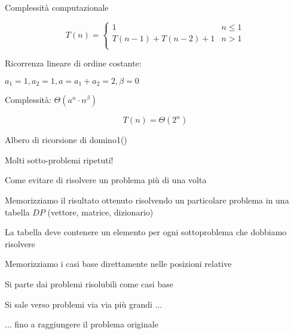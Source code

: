 \begin{frame}{Complessità computazionale}

\vspace{-9pt}

\[
  T(n) = \begin{cases}
  1 & n \leq 1 \\
  T(n-1)+T(n-2)+1 & n > 1\\
  \end{cases}
\]

\pause
Ricorrenza lineare di ordine costante:
\BI
\item $a_1 = 1, a_2=1, a= a_1+a_2 = 2, \beta=0$
\item Complessità: $\Theta(a^n \cdot n^\beta)$
\EI

\[
T(n) = \Theta(2^n)
\]

\end{frame}

\begin{frame}{Albero di ricorsione di \textsf{domino1()}}
  

\vspace{-12pt}
\begin{flushright}
Molti sotto-problemi ripetuti!
\end{flushright}
\end{frame}

\begin{frame}{Come evitare di risolvere un problema più di una volta}
  
\vspace{-9pt}
\begin{myboxtitle}[Tabella DP]
\BIL
\item Memorizziamo il risultato ottenuto risolvendo un particolare problema
in una \alert{tabella $\mathit{DP}$} (vettore, matrice, dizionario)
\item La tabella deve contenere un elemento per ogni sottoproblema che dobbiamo risolvere
\EIL
\end{myboxtitle}

\begin{myboxtitle}
\BIL
\item Memorizziamo i casi base direttamente nelle posizioni relative
\EIL
\end{myboxtitle}

\begin{myboxtitle}
\BIL
\item Si parte dai problemi risolubili come casi base
\item Si sale verso problemi via via più grandi ...
\item ... fino a raggiungere il problema originale
\EIL
\end{myboxtitle}

\end{frame}



